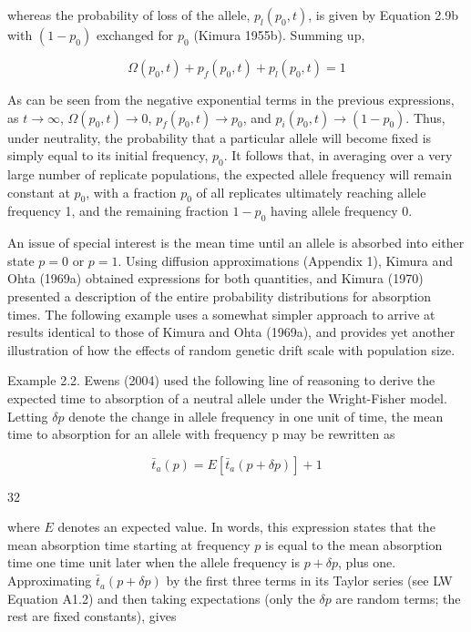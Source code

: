\documentclass{article}
\begin{document}
whereas the probability of loss of the allele,  $ p_l(p_0, t) $, is given by Equation 2.9b with  $ (1 - p_0) $ exchanged for  $ p_0 $ (Kimura 1955b). Summing up,

\begin{equation}
\Omega(p_{0},t)+p_{f}(p_{0},t)+p_{l}(p_{0},t)=1
\tag{2.10}
\label{eq:2_10}
\end{equation}

As can be seen from the negative exponential terms in the previous expressions, as  $ t \to \infty $,  $ \Omega(p_0, t) \to 0 $,  $ p_f(p_0, t) \to p_0 $, and  $ p_i(p_0, t) \to (1 - p_0) $. Thus, under neutrality, the probability that a particular allele will become fixed is simply equal to its initial frequency,  $ p_0 $. It follows that, in averaging over a very large number of replicate populations, the expected allele frequency will remain constant at  $ p_0 $, with a fraction  $ p_0 $ of all replicates ultimately reaching allele frequency 1, and the remaining fraction  $ 1 - p_0 $ having allele frequency 0.

An issue of special interest is the mean time until an allele is absorbed into either state  $ p = 0 $ or  $ p = 1 $. Using diffusion approximations (Appendix 1), Kimura and Ohta (1969a) obtained expressions for both quantities, and Kimura (1970) presented a description of the entire probability distributions for absorption times. The following example uses a somewhat simpler approach to arrive at results identical to those of Kimura and Ohta (1969a), and provides yet another illustration of how the effects of random genetic drift scale with population size.

Example 2.2. Ewens (2004) used the following line of reasoning to derive the expected time to absorption of a neutral allele under the Wright-Fisher model. Letting  $ \delta p $ denote the change in allele frequency in one unit of time, the mean time to absorption for an allele with frequency p may be rewritten as

\begin{equation}
\bar{t}_{a}(p)=E[\bar{t}_{a}(p+\delta p)]+1
\end{equation}

32

where $E$ denotes an expected value. In words, this expression states that the mean absorption time starting at frequency $p$ is equal to the mean absorption time one time unit later when the allele frequency is $p + \delta p$, plus one. Approximating $\bar{t}_a(p + \delta p)$ by the first three terms in its Taylor series (see LW Equation A1.2) and then taking expectations (only the $\delta p$ are random terms; the rest are fixed constants), gives
\end{document}
